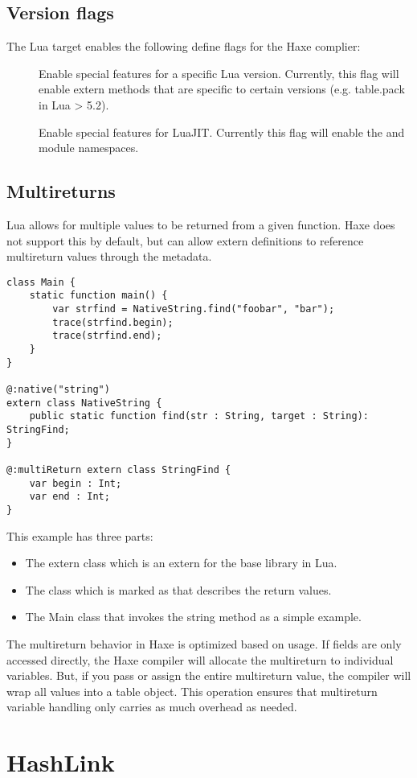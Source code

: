 \subsection{Version flags}
\label{target-lua-flags}

The Lua target enables the following define flags for the Haxe complier:

\begin{description}
	\item[] Enable special features for a specific Lua version. Currently, this flag will enable extern methods that are specific to certain versions (e.g. table.pack in Lua > 5.2).
	\item[] Enable special features for LuaJIT.  Currently this flag will enable the  and  module namespaces.
\end{description}

\subsection{Multireturns}
\label{target-lua-multireturns}

Lua allows for multiple values to be returned from a given function.  Haxe
does not support this by default, but can allow extern definitions to reference
multireturn values through the  metadata.

\begin{lstlisting}
class Main {
    static function main() {
        var strfind = NativeString.find("foobar", "bar");
        trace(strfind.begin);
        trace(strfind.end);
    }
}

@:native("string")
extern class NativeString {
	public static function find(str : String, target : String): StringFind;
}

@:multiReturn extern class StringFind {
	var begin : Int;
	var end : Int;
}
\end{lstlisting}

This example has three parts:

\begin{itemize}
	\item The extern class  which is an extern for the base  library in Lua.
	\item The  class which is marked as  that describes the return values.
	\item The Main class that invokes the string method as a simple example.
\end{itemize}

The multireturn behavior in Haxe is optimized based on usage.  If fields are
only accessed directly, the Haxe compiler will allocate the multireturn to
individual variables.  But, if you pass or assign the entire multireturn value,
the compiler will wrap all values into a table object.  This operation ensures
that multireturn variable handling only carries as much overhead as needed.



\section{HashLink}
\label{target-hl}
